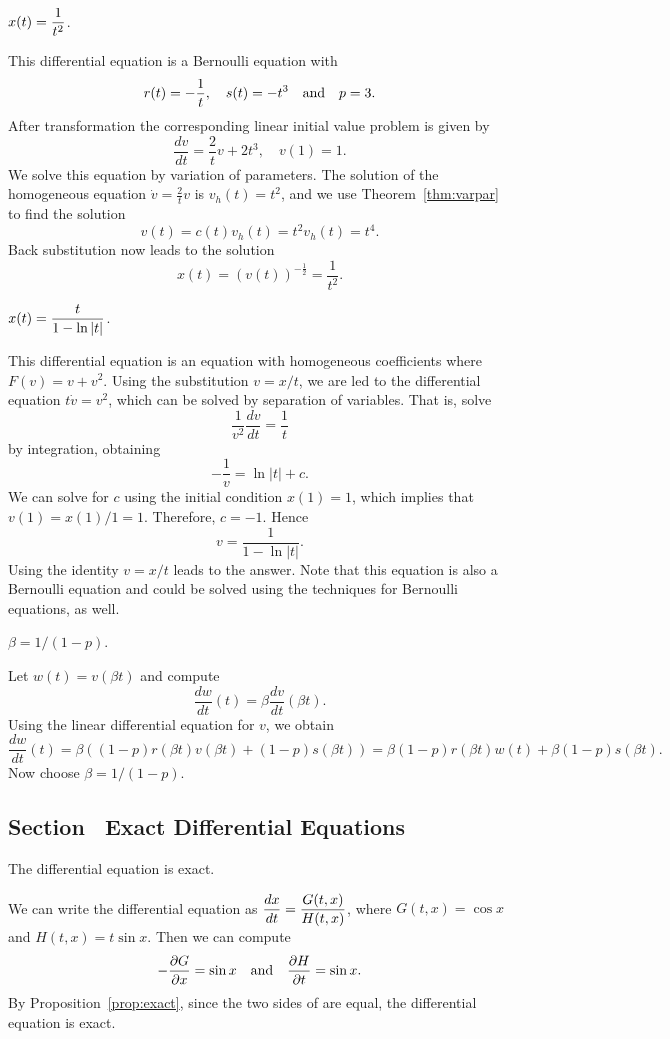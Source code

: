 \documentclass{ximera}
\begin{document}
 \ans $x(t) = \displaystyle\frac{1}{t^2}$.

\soln This differential equation is a Bernoulli equation with
\[
r(t) = -\frac{1}{t},\quad s(t) = -t^3 \quad\mbox{and}\quad p=3.
\]
After transformation the corresponding linear initial value problem
is given by
\[
\frac{dv}{dt} = \frac{2}{t} v + 2t^3,\quad v(1)=1.
\]
We solve this equation by variation of parameters.  The solution
of the homogeneous equation $\dot v = \frac{2}{t} v$ is
$v_h(t)=t^2$, and we use Theorem~\ref{thm:varpar} to find the solution
\[
v(t) = c(t) v_h(t) = t^2 v_h(t) = t^4.
\]
Back substitution now leads to the solution
\[
x(t) = (v(t))^{-\frac{1}{2}} = \frac{1}{t^2}.
\]


 \ans $x(t) = \displaystyle\frac{t}{1-\ln|t|}$.

\soln  This differential equation is an equation with homogeneous
coefficients where $F(v) = v + v^2$.  Using the substitution $v=x/t$, we
are led to the differential equation $t\dot{v}=v^2$, which can be solved
by separation of variables.  That is, solve
\[
 \frac{1}{v^2} \frac{dv}{dt} = \frac{1}{t}
\]
by integration, obtaining
\[
-\frac{1}{v} = \ln|t| + c.
\]
We can solve for $c$ using the initial condition $x(1)=1$, which implies
that $v(1)=x(1)/1=1$.  Therefore, $c=-1$.  Hence
\[
v = \frac{1}{1-\ln|t|}.
\]
Using the identity $v=x/t$ leads to the answer.   Note that this equation is
also a Bernoulli equation and could be solved using the techniques for
Bernoulli equations, as well.

 \ans $\beta = 1/(1-p)$.

\soln Let $w(t) = v(\beta t)$ and compute
\[
\frac{dw}{dt}(t) = \beta \frac{dv}{dt}(\beta t).
\]
Using the linear differential equation for $v$, we obtain
\[
\frac{dw}{dt}(t) = \beta ((1-p) r(\beta t) v(\beta t) + (1-p) s(\beta t))
=  \beta (1-p) r(\beta t) w(t) + \beta (1-p) s(\beta t).
\]
Now choose $\beta = 1/(1-p)$.


\subsection*{Section~\protect{\ref{S:exact}} Exact Differential Equations}


 \ans The differential equation is exact.

\soln We can write the differential equation as $\displaystyle\frac{dx}{dt} =
\frac{G(t,x)}{H(t,x)}$, where $G(t,x) = \cos x$ and $H(t,x) = t\sin x$. 
Then we can compute
\[
-\frac{\partial G}{\partial x} = \sin x \quad\mbox{and}\quad
\frac{\partial H}{\partial t} = \sin x.
\]
By Proposition~\ref{prop:exact}, since the
two sides of  are equal, the differential equation is exact.
\end{document}
